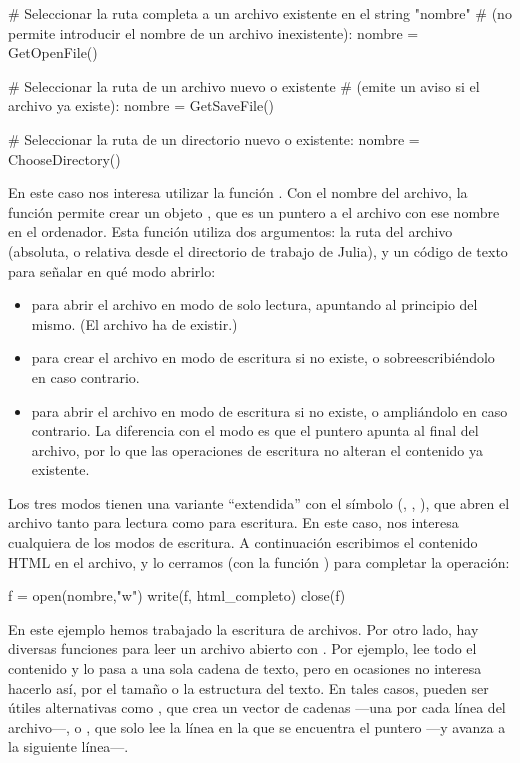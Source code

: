 \begin{juliacode}
# Seleccionar la ruta completa a un archivo existente en el string "nombre"
# (no permite introducir el nombre de un archivo inexistente):
nombre = GetOpenFile()

# Seleccionar la ruta de un archivo nuevo o existente
# (emite un aviso si el archivo ya existe):
nombre = GetSaveFile()

# Seleccionar la ruta de un directorio nuevo o existente:
nombre = ChooseDirectory()
\end{juliacode}

En este caso nos interesa utilizar la función . Con el nombre del archivo, la función  permite crear un objeto , que es un puntero a el archivo con ese nombre en el ordenador. Esta función utiliza dos argumentos: la ruta del archivo (absoluta, o relativa desde el directorio de trabajo de Julia), y un código de texto para señalar en qué modo abrirlo:

\begin{itemize}
  \item {} para abrir el archivo en modo de solo lectura, apuntando al principio del mismo. (El archivo ha de existir.) \\
  \item {} para crear el archivo en modo de escritura si no existe, o sobreescribiéndolo en caso contrario. \\
  \item {} para abrir el archivo en modo de escritura si no existe, o ampliándolo en caso contrario. La diferencia con el modo  es que el puntero apunta al final del archivo, por lo que las operaciones de escritura no alteran el contenido ya existente. \\ 
\end{itemize}

Los tres modos tienen una variante ``extendida'' con el símbolo \code{+} (, , ), que abren el archivo tanto para lectura como para escritura. En este caso, nos interesa cualquiera de los modos de escritura. A continuación escribimos el contenido HTML en el archivo, y lo cerramos (con la función ) para completar la operación:

\begin{juliacode}
f = open(nombre,"w")
write(f, html_completo)
close(f)
\end{juliacode}

En este ejemplo hemos trabajado la escritura de archivos. Por otro lado, hay diversas funciones para leer un archivo abierto con . Por ejemplo,  lee todo el contenido y lo pasa a una sola cadena de texto, pero en ocasiones no interesa hacerlo así, por el tamaño o la estructura del texto. En tales casos, pueden ser útiles alternativas como , que crea un vector de cadenas ---una por cada línea del archivo---, o , que solo lee la línea en la que se encuentra el puntero ---y avanza a la siguiente línea---.

